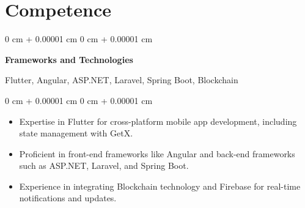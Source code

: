 \documentclass[10pt, letterpaper]{article}
\newenvironment{highlights}{
    \begin{itemize}[
        topsep=0.10 cm,
        parsep=0.10 cm,
        partopsep=0pt,
        itemsep=0pt,
        leftmargin=0 cm + 10pt
    ]
}{
    \end{itemize}
} %
\newenvironment{onecolentry}{
    \begin{adjustwidth}{
        0 cm + 0.00001 cm
    }{
        0 cm + 0.00001 cm
    }
}{
    \end{adjustwidth}
} %
\newenvironment{twocolentry}[2][]{
    \onecolentry
    \def\secondColumn{#2}
    \setcolumnwidth{\fill, 4.5 cm}
    \begin{paracol}{2}
}{
    \switchcolumn \raggedleft \secondColumn
    \end{paracol}
    \endonecolentry
} %
\begin{document}
        
        
                
        
                    
        
                        
        
        
            
        
        
        \section{Competence}
        
                \begin{twocolentry}{
                    Flutter, Angular, ASP.NET, Laravel, Spring Boot, Blockchain
                }
                    \textbf{Frameworks and Technologies}
                \end{twocolentry}
                
                \vspace{0.10 cm}
                \begin{onecolentry}
                    \begin{highlights}
                        \item Expertise in Flutter for cross-platform mobile app development, including state management with GetX.
                        \item Proficient in front-end frameworks like Angular and back-end frameworks such as ASP.NET, Laravel, and Spring Boot.
                        \item Experience in integrating Blockchain technology and Firebase for real-time notifications and updates.
                    \end{highlights}
                \end{onecolentry}
                
\end{document}
